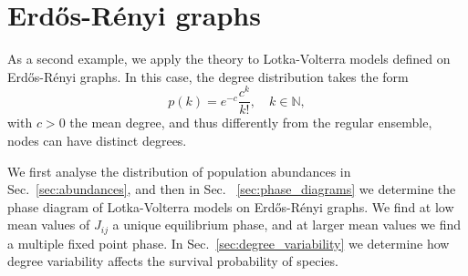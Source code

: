 \documentclass[11pt,a4paper]{article}
\newcommand{\nm}[1]{{\color{red}[NM: #1]}}
\newcommand{\iz}[1]{{\color{orange}[IN: #1]}}
\begin{document}



\section{Erd\H{o}s-R\'{e}nyi graphs}
As a second example, we apply the theory to Lotka-Volterra models defined on  Erd\H{o}s-R\'{e}nyi graphs.    In this case, the degree distribution takes the form
\begin{equation}
p(k) = e^{-c}\frac{c^k}{k!}, \quad k\in \mathbb{N},
\end{equation}
with $c>0 $ the mean degree, and thus differently from the regular ensemble,  nodes can have distinct degrees.     

We first analyse the distribution of population abundances in Sec.~\ref{sec:abundances}, and then in Sec. ~\ref{sec:phase_diagrams} we determine the phase diagram of Lotka-Volterra models on Erd\H{o}s-R\'{e}nyi graphs.  We find at low mean values of  $J_{ij}$ a unique equilibrium phase, and at larger mean values we find a multiple fixed point phase.   In Sec.~\ref{sec:degree_variability} we determine how degree variability affects the survival probability of species.   
\end{document}
